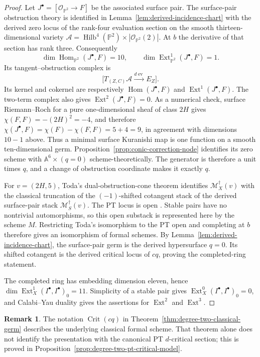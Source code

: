 \documentclass[11pt,reqno]{amsart}
\theoremstyle{definition}
\newtheorem{remark}[theorem]{Remark}
\newcommand{\Pp}{\mathbb P}
\newcommand{\Ocal}{\mathcal O}
\newcommand{\Hilb}{\operatorname{Hilb}}
\newcommand{\Hom}{\operatorname{Hom}}
\begin{document}
\begin{proof}
Let $J^\bullet=[\Ocal_{\Pp^2}\to F]$ be the associated surface pair.  The
surface-pair obstruction theory is identified in
Lemma~\ref{lem:derived-incidence-chart} with the derived zero locus of the
rank-four evaluation section on the smooth thirteen-dimensional variety
$\mathcal A=\Hilb^4(\Pp^2)\times|\Ocal_{\Pp^2}(2)|$.  At $b$ the derivative
of that section has rank three.  Consequently
\[
 \dim\Hom_{\Pp^2}(J^\bullet,F)=10,
 \qquad
 \dim\operatorname{Ext}^1_{\Pp^2}(J^\bullet,F)=1.
\]
Its tangent--obstruction complex is
\[
 \bigl[T_{(Z,C)}\mathcal A
       \xrightarrow{d\operatorname{ev}}E_Z\bigr].
\]
Its kernel and cokernel are respectively
$\Hom(J^\bullet,F)$ and $\operatorname{Ext}^1(J^\bullet,F)$.
The two-term complex also gives
$\operatorname{Ext}^2(J^\bullet,F)=0$.  As a numerical check, surface
Riemann--Roch for a pure one-dimensional sheaf of class $2H$ gives
$\chi(F,F)=-(2H)^2=-4$, and therefore
$\chi(J^\bullet,F)=\chi(F)-\chi(F,F)=5+4=9$, in agreement with dimensions
$10-1$ above.
Thus a minimal surface Kuranishi map is one function on a smooth
ten-dimensional germ.  Proposition~\ref{prop:conic-correction-node}
identifies its zero scheme with
$\mathbb A^6\times(q=0)$ scheme-theoretically.  The generator is therefore
a unit times $q$, and a change of obstruction coordinate makes it exactly
$q$.

For $v=(2H,5)$, Toda's dual-obstruction-cone theorem
\cite[Theorem~4.1.3(ii)]{TodaLocal} identifies
$\mathcal M_X^\dagger(v)$ with the classical truncation of the
$(-1)$-shifted cotangent stack of the derived surface-pair stack
$\mathcal M_S^\dagger(v)$.  The PT locus is open
\cite[Section~4.2]{TodaLocal}.  Stable pairs have no nontrivial
automorphisms, so this open substack is represented here by the scheme $M$.
Restricting Toda's isomorphism to the PT open and completing at $b$
therefore gives an isomorphism of formal schemes.  By
Lemma~\ref{lem:derived-incidence-chart}, the surface-pair germ is the
derived hypersurface $q=0$.  Its shifted cotangent is the derived critical
locus of $cq$, proving the completed-ring statement.

The completed ring has embedding dimension eleven, hence
$\dim\operatorname{Ext}^1_X(I^\bullet,I^\bullet)_0=11$.  Simplicity of a
stable pair gives $\operatorname{Ext}^0_X(I^\bullet,I^\bullet)_0=0$, and
Calabi--Yau duality gives the assertions for $\operatorname{Ext}^2$ and
$\operatorname{Ext}^3$.
\end{proof}

\begin{remark}
The notation $\operatorname{Crit}(cq)$ in
Theorem~\ref{thm:degree-two-classical-germ} describes the underlying
classical formal scheme.  That theorem alone does not identify the
presentation with the canonical PT $d$-critical section; this is proved in
Proposition~\ref{prop:degree-two-pt-critical-model}.
\end{remark}
\end{document}
